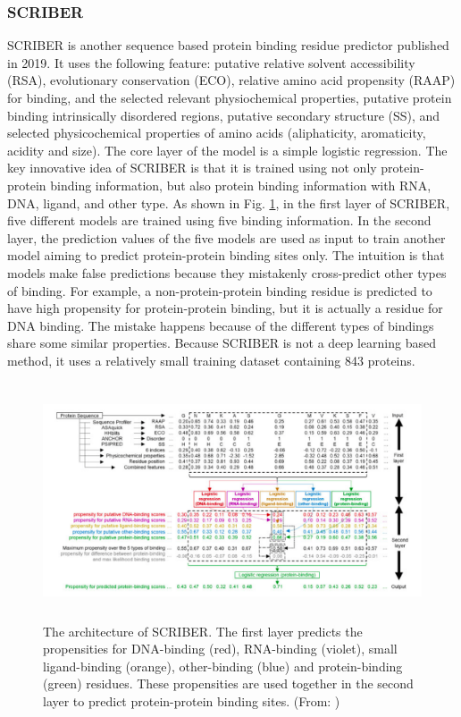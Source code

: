 \subsubsection{SCRIBER}
SCRIBER \cite{zhang2019scriber} is another sequence based protein binding residue predictor published in 2019. It uses the following feature: putative relative solvent accessibility (RSA), evolutionary conservation (ECO), relative amino acid propensity (RAAP) for binding, and the selected relevant physiochemical properties, putative protein binding intrinsically disordered regions, putative secondary structure (SS), and selected physicochemical properties of amino acids (aliphaticity, aromaticity, acidity and size). The core layer of the model is a simple logistic regression. The key innovative idea of SCRIBER is that it is trained using not only protein-protein binding information, but also protein binding information with RNA, DNA, ligand, and other type. As shown in Fig. \ref{fig_SCRIBER}, in the first layer of SCRIBER, five different models are trained using five binding information. In the second layer, the prediction values of the five models are used as input to train another model aiming to predict protein-protein binding sites only. The intuition is that models make false predictions because they mistakenly cross-predict other types of binding. For example, a non-protein-protein binding residue is predicted to have high propensity for protein-protein binding, but it is actually a residue for DNA binding. The mistake happens because of the different types of bindings share some similar properties. Because SCRIBER is not a deep learning based method, it uses a relatively small training dataset containing 843 proteins.
\begin{figure}[h!]
\begin{center}
\includegraphics[height = 7cm]{img/SCRIBER.png}
\caption[The architecture of SCRIBER]{The architecture of SCRIBER. The first layer predicts the propensities for DNA-binding (red), RNA-binding (violet), small ligand-binding (orange), other-binding (blue) and protein-binding (green) residues. These propensities are used together in the second layer to predict protein-protein binding sites. (From: \cite{zhang2019scriber})  \label{fig_SCRIBER}}
\end{center}
\end{figure} 
